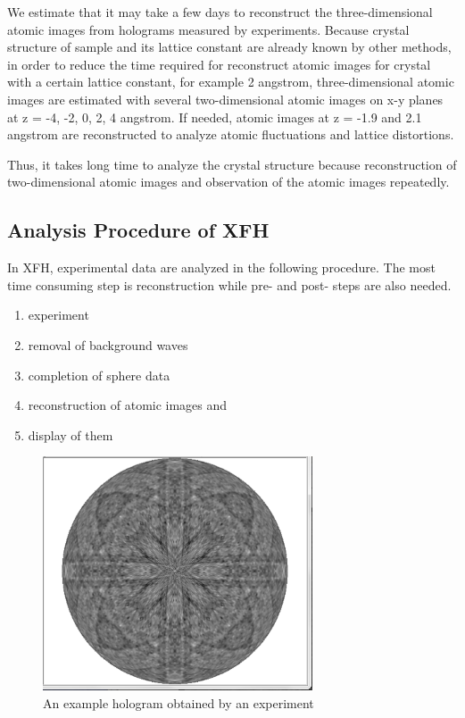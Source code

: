\documentclass[graybox,vecphys]{svmult}
\begin{document}
We estimate that it may take a few days to reconstruct the
three-dimensional atomic images from holograms measured by
experiments. Because crystal structure of sample and its lattice
constant are already known by other methods, in order to reduce the
time required for reconstruct atomic images for crystal with a certain
lattice constant, for example 2 angstrom, three-dimensional atomic
images are estimated with several two-dimensional atomic images on x-y
planes at z = -4, -2, 0, 2, 4 angstrom.  If needed, atomic images at z
= -1.9 and 2.1 angstrom are reconstructed to analyze atomic
fluctuations and lattice distortions.

Thus, it takes long time to analyze the crystal structure because
reconstruction of two-dimensional atomic images and observation of the
atomic images repeatedly.

\subsection{Analysis Procedure of XFH}\label{sec:xfh_analysis}
In XFH, experimental data are analyzed in the following procedure.
The most time consuming step is reconstruction while pre- and post- steps
are also needed.

\begin{enumerate}
\item experiment
\item removal of background waves
\item completion of sphere data
\item reconstruction of atomic images and
\item display of them
\end{enumerate}

\begin{figure}[t]
  \begin{center}
    \includegraphics[width=8cm]{sphere18500ev.png}
    \caption{An example hologram obtained by an experiment}\label{fig:hologram}
  \end{center}
\end{figure}
\end{document}
